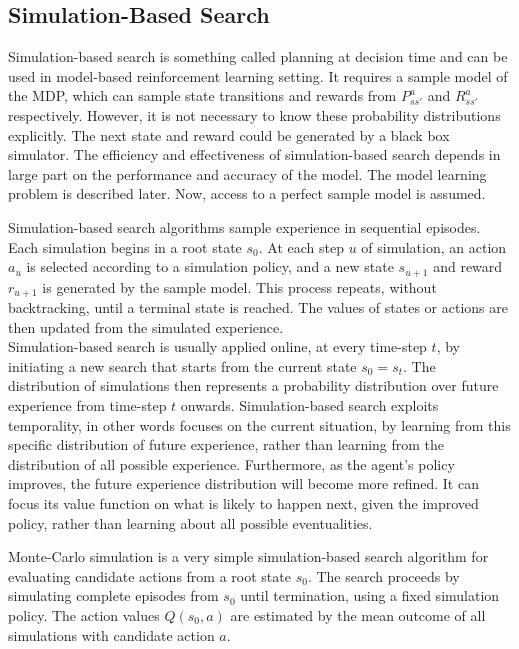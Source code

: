 \subsection{Simulation-Based Search}

Simulation-based search is something called planning at decision time \cite{Book.RLAI} and can be used in model-based reinforcement learning setting. It requires a sample model of the MDP, which can sample state transitions and rewards from $P^a_{ss'}$ and $R^a_{ss'}$ respectively. However, it is not necessary to know these probability distributions explicitly. The next state and reward could be generated by a black box simulator. The efficiency and effectiveness of simulation-based search depends in large part on the performance and accuracy of the model. The model learning problem is described later. Now, access to a perfect sample model is assumed.

Simulation-based search algorithms sample experience in sequential episodes. Each simulation begins in a root state $s_0$. At each step $u$ of simulation, an action $a_u$ is selected according to a simulation policy, and a new state $s_{u+1}$ and reward $r_{u+1}$ is generated by the sample model. This process repeats, without backtracking, until a terminal state is reached. The values of states or actions are then updated from the simulated experience. \\ Simulation-based search is usually applied online, at every time-step $t$, by initiating a new search that starts from the current state $s_0 = s_t$. The distribution of simulations then represents a probability distribution over future experience from time-step $t$ onwards. Simulation-based search exploits temporality, in other words focuses on the current situation, by learning from this specific distribution of future experience, rather than learning from the distribution of all possible experience. Furthermore, as the agent’s policy improves, the future experience distribution will become more refined. It can focus its value function on what is likely to happen next, given the improved policy, rather than learning about all possible eventualities.

Monte-Carlo simulation is a very simple simulation-based search algorithm for evaluating candidate actions from a root state $s_0$. The search proceeds by simulating complete episodes from $s_0$ until termination, using a fixed simulation policy. The action values $Q(s_0, a)$ are estimated by the mean outcome of all simulations with candidate action $a$.

